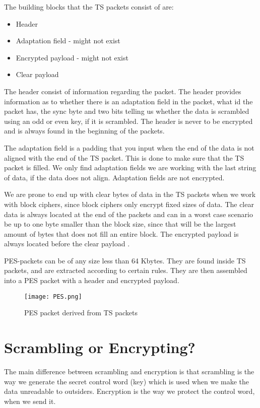 The building blocks that the TS packets consist of are:

\begin{itemize}
\item Header
\item Adaptation field - might not exist
\item Encrypted payload - might not exist
\item Clear payload
\end{itemize}

The header consist of information regarding the packet. The header provides 
information as to whether there is an adaptation field in the packet, what id 
the packet has, the sync byte and two bits telling us whether the data is 
scrambled using an odd or even key, if it is scrambled. The header is never to 
be encrypted and is always found in the beginning of the packets.

The adaptation field is a padding that you input when the end of the data is not 
aligned with the end of the TS packet. This is done to make sure that the TS 
packet is filled. We only find adaptation fields we are working with the last 
string of data, if the data does not align. Adaptation fields are not encrypted.

We are prone to end up with clear bytes of data in the TS packets when we work 
with block ciphers, since block ciphers only encrypt fixed sizes of data. The 
clear data is always located at the end of the packets and can in a worst case 
scenario be up to one byte smaller than the block size, since that will be the 
largest amount of bytes that does not fill an entire block. The encrypted 
payload is always located before  the clear 
payload \cite[pp. 10--11]{DVB:2013}.

PES-packets can be of any size less than 64 Kbytes. They are found inside TS 
packets, and are extracted according to certain rules.  They are then assembled into a PES packet 
with a header and encrypted payload.

\begin{figure}
  \texttt{[image: PES.png]}
  \label{img:PES}
  \caption{PES packet derived from TS packets}
\end{figure}

\section{Scrambling or Encrypting?}
The main difference between scrambling and encryption is that scrambling is the
way we generate the secret control word (key) which is used when we make the
data unreadable to outsiders. Encryption is the way we protect the control word, 
when we send it.

